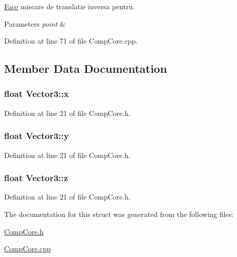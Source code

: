 \hyperlink{struct_face}{Face} miscare de translatie inversa pentru. 


\begin{DoxyParams}{Parameters}
{\em point} & \\
\hline
\end{DoxyParams}


Definition at line 71 of file Comp\-Core.\-cpp.



\subsection{Member Data Documentation}
\hypertarget{struct_vector3_a7e2d3237b29a2f29d7b3d8b2934e35f2}{
\subsubsection[{x}]{\setlength{\rightskip}{0pt plus 5cm}float Vector3\-::x}}\label{struct_vector3_a7e2d3237b29a2f29d7b3d8b2934e35f2}


Definition at line 21 of file Comp\-Core.\-h.

\hypertarget{struct_vector3_a86eb35a9fa2d5a49e7fad66a35fa9c13}{
\subsubsection[{y}]{\setlength{\rightskip}{0pt plus 5cm}float Vector3\-::y}}\label{struct_vector3_a86eb35a9fa2d5a49e7fad66a35fa9c13}


Definition at line 21 of file Comp\-Core.\-h.

\hypertarget{struct_vector3_aa8c9461eb24bd2c364258078811a3e9d}{
\subsubsection[{z}]{\setlength{\rightskip}{0pt plus 5cm}float Vector3\-::z}}\label{struct_vector3_aa8c9461eb24bd2c364258078811a3e9d}


Definition at line 21 of file Comp\-Core.\-h.



The documentation for this struct was generated from the following files\-:\begin{DoxyCompactItemize}
\item 
\hyperlink{_comp_core_8h}{Comp\-Core.\-h}\item 
\hyperlink{_comp_core_8cpp}{Comp\-Core.\-cpp}\end{DoxyCompactItemize}
